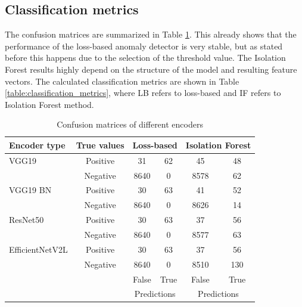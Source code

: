 \subsection{Classification metrics}
The confusion matrices are summarized in Table \ref{table:confusion_matrices}.
This already shows that the performance of the loss-based anomaly detector is very stable,
but as stated before this happens due to the selection of the threshold value.
The Isolation Forest results highly depend on the structure of the model and resulting feature vectors.
The calculated classification metrics are shown in Table \ref{table:classification_metrics},
where LB refers to loss-based and IF refers to Isolation Forest method.

\begin{table}[!ht]
    \centering
    \begin{tabular}{l c |c c| c c}
        Encoder type    & True values & \multicolumn{2}{c|}{Loss-based}  & \multicolumn{2}{c}{Isolation Forest}                \\
        \hline
        VGG19           & Positive    & 31                               & 62                                   & 45    & 48   \\
                        & Negative    & 8640                             & 0                                    & 8578  & 62   \\
        \hline
        VGG19 BN        & Positive    & 30                               & 63                                   & 41    & 52   \\
                        & Negative    & 8640                             & 0                                    & 8626  & 14   \\
        \hline
        ResNet50        & Positive    & 30                               & 63                                   & 37    & 56   \\
                        & Negative    & 8640                             & 0                                    & 8577  & 63   \\
        \hline
        EfficientNetV2L & Positive    & 30                               & 63                                   & 37    & 56   \\
                        & Negative    & 8640                             & 0                                    & 8510  & 130  \\
        \hline
                        &             & False                            & True                                 & False & True \\
                        &             & \multicolumn{2}{c|}{Predictions} & \multicolumn{2}{c}{Predictions}                     \\
    \end{tabular}
    \caption{Confusion matrices of different encoders}
    \label{table:confusion_matrices}
\end{table}

